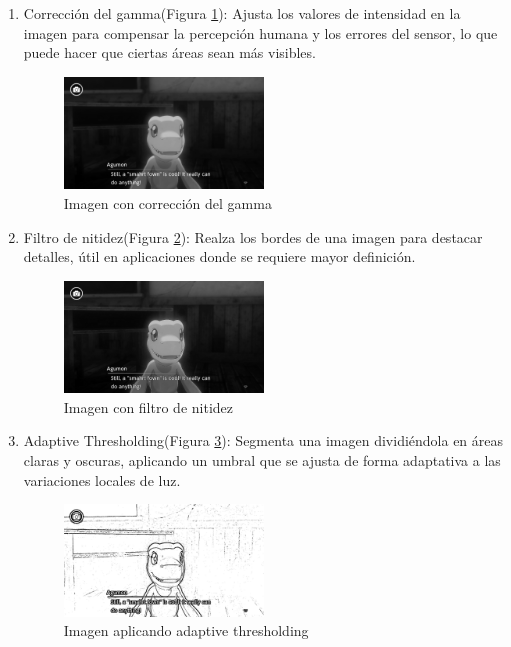 \begin{enumerate}
	\item Corrección del gamma(Figura \ref{fig:Gamma}):
	Ajusta los valores de intensidad en la imagen para compensar la percepción humana y los errores del sensor, lo que puede hacer que ciertas áreas sean más visibles.
		\begin{figure}[H]
		\centering
		\includegraphics[width = 0.5\textwidth]{Imagenes/Preprocesado/4.png}
			\caption{Imagen con corrección del gamma}
			\label{fig:Gamma}
	\end{figure}
	
	\item Filtro de nitidez(Figura \ref{fig:F.Nitidez}): 
	Realza los bordes de una imagen para destacar detalles, útil en aplicaciones donde se requiere mayor definición.
		\begin{figure}[H]
		\centering
		\includegraphics[width = 0.5\textwidth]{Imagenes/Preprocesado/5.png}
			\caption{Imagen con filtro de nitidez}
			\label{fig:F.Nitidez}
	\end{figure}
	
	\item Adaptive Thresholding(Figura \ref{fig:Thresholding}):
	Segmenta una imagen dividiéndola en áreas claras y oscuras, aplicando un umbral que se ajusta de forma adaptativa a las variaciones locales de luz.
		\begin{figure}[H]
		\centering
		\includegraphics[width = 0.5\textwidth]{Imagenes/Preprocesado/6.png}
		\caption{Imagen aplicando adaptive thresholding}
			\label{fig:Thresholding}
	\end{figure}
	

\end{enumerate}
